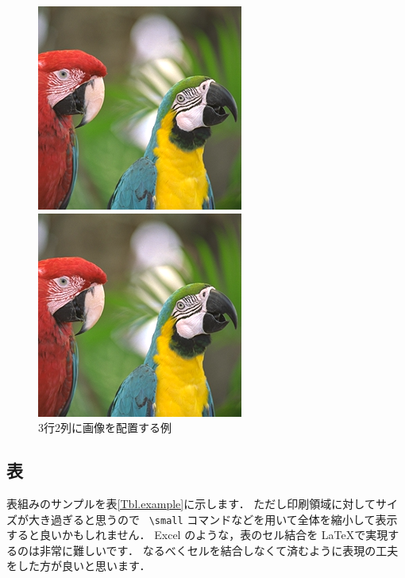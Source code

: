 \documentclass[dvipdfmx,disablejfam,nosetpagesize,12pt]{jsbook}
\begin{document}
\begin{figure}[p]
\begin{minipage}[c]{.47\hsize}
      \includegraphics[width=.8\hsize]{figure/example-png.png}
   \end{minipage}
   \begin{minipage}[c]{.47\hsize}
      \centering
      \includegraphics[width=.8\hsize]{figure/example-png.png}
   \end{minipage}
   \caption{3行2列に画像を配置する例}
   \label{Fig.example-3x2-grid}
\end{figure}

\subsection{表}
表組みのサンプルを表\ref{Tbl.example}に示します．
ただし印刷領域に対してサイズが大き過ぎると思うので
\ \verb+\small+ コマンドなどを用いて全体を縮小して表示すると良いかもしれません．
Excel のような，表のセル結合を \LaTeX で実現するのは非常に難しいです．
なるべくセルを結合しなくて済むように表現の工夫をした方が良いと思います．
\end{document}
